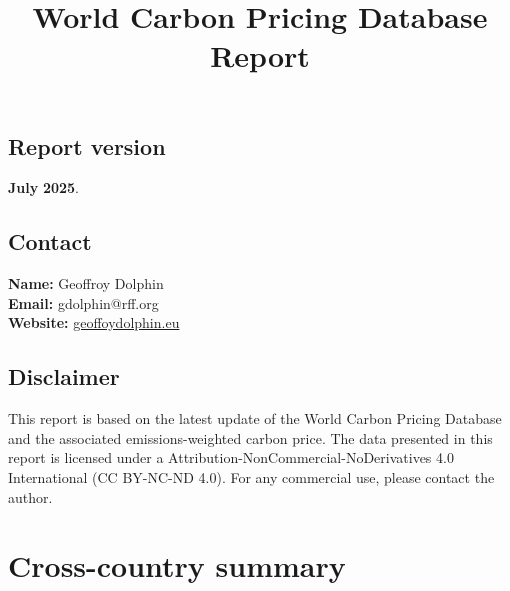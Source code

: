 \documentclass[
  letterpaper,
  DIV=11,
  numbers=noendperiod]{scrartcl}
\title{World Carbon Pricing Database Report}
\author{}
\date{}
\renewcommand*\contentsname{Table of contents}
\newcommand\contentsname{Table of contents}
\begin{document}
\maketitle

\renewcommand*\contentsname{Table of contents}
{
\hypersetup{linkcolor=}
\setcounter{tocdepth}{2}
\tableofcontents
}

\subsection*{Report version}\label{report-version}

\textbf{July} \textbf{2025}.

\subsection*{Contact}\label{contact}

\textbf{Name:} Geoffroy Dolphin\\
\textbf{Email:} gdolphin@rff.org\\
\textbf{Website:} \url{geoffoydolphin.eu}

\subsection*{Disclaimer}\label{disclaimer}

This report is based on the latest update of the World Carbon Pricing
Database and the associated emissions-weighted carbon price. The data
presented in this report is licensed under a
Attribution-NonCommercial-NoDerivatives 4.0 International (CC BY-NC-ND
4.0). For any commercial use, please contact the author.

\newpage

\tableofcontents

\listoffigures

\listoftables

\newpage

\section{Cross-country summary}\label{cross-country-summary}
\end{document}

